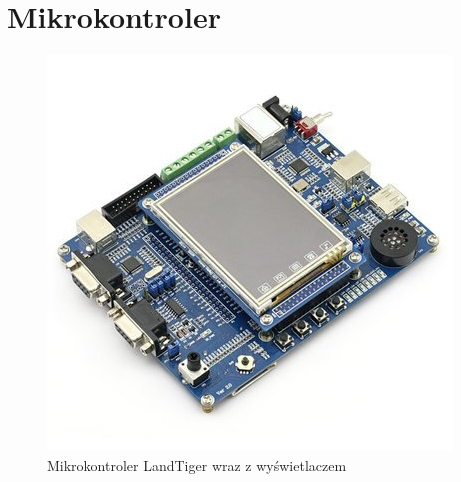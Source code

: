 \documentclass{BscUS}
\begin{document}
\chapter{Mikrokontroler}
\label{microcontrollerChapter}
\begin{figure}[h]
\centering
\includegraphics{./img/landTiger}
\caption{Mikrokontroler LandTiger wraz z wyświetlaczem}
\end{figure}
\end{document}
